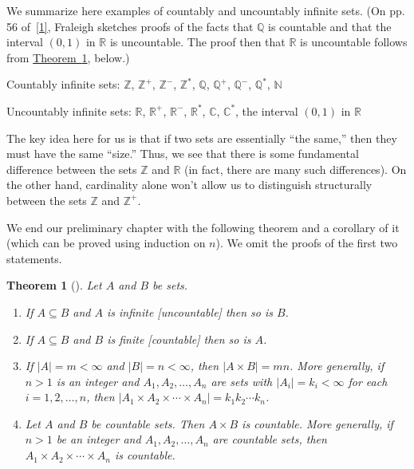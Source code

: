 \documentclass[10pt,]{book}
\theoremstyle{plain}
\newtheorem{theorem}{Theorem}[section]
\theoremstyle{definition}
\theoremstyle{definition}
\theoremstyle{definition}
\theoremstyle{definition}
\numberwithin{equation}{section}
\def\Z{\mathbb{Z}}
\def\R{\mathbb{R}}
\def\Q{\mathbb{Q}}
\def\C{\mathbb{C}}
\def\N{\mathbb{N}}
\newcommand{\lt}{<}
\begin{document}
We summarize here examples of countably and uncountably infinite sets. (On pp. 5\textendash{}6 of~\hyperlink{F}{[1]}, Fraleigh sketches proofs of the facts that \(\Q\) is countable and that the interval \((0,1)\) in \(\R\) is uncountable. The proof then that \(\R\) is uncountable follows from \hyperref[cardthm]{Theorem~\ref{cardthm}}, below.)%
\par
Countably infinite sets: \(\Z\), \(\Z^+\), \(\Z^-\), \(\Z^*\), \(\Q\), \(\Q^+\), \(\Q^-\), \(\Q^*\), \(\N\)%
\par
Uncountably infinite sets: \(\R\), \(\R^+\), \(\R^-\), \(\R^*\), \(\C\), \(\C^*\),  the interval \((0,1)\) in \(\R\)%
\par
The key idea here for us is that if two sets are essentially ``the same,'' then they must have the same ``size.'' Thus, we see that there is some fundamental difference between the sets \(\Z\) and \(\R\) (in fact, there are many such differences). On the other hand, cardinality alone won't allow us to distinguish structurally between the sets \(\Z\) and \(\Z^+\).%
\par
We end our preliminary chapter with the following theorem and a corollary of it (which can be proved using induction on \(n\)). We omit the proofs of the first two statements.%
\begin{theorem}[{}]\label{cardthm}
Let \(A\) and \(B\) be sets. \leavevmode%
\begin{enumerate}
\item\hypertarget{li-19}{}If \(A\subseteq B\) and \(A\) is infinite [uncountable] then so is \(B\).%
\item\hypertarget{li-20}{}If \(A\subseteq B\) and \(B\) is finite [countable] then so is \(A\).%
\item\hypertarget{li-21}{}If \(|A|=m\lt \infty\) and \(|B|=n\lt  \infty\), then \(|A\times B|=mn\).  More generally, if \(n>1\) is an integer and \(A_1, A_2, \ldots, A_n\)  are sets with \(|A_i|=k_i\lt \infty\) for each \(i=1,2,\ldots, n\), then \(|A_1 \times A_2 \times \cdots \times A_n|=k_1k_2\cdots k_n\).%
\item\hypertarget{li-22}{}Let \(A\) and \(B\) be countable sets. Then \(A \times B\) is countable. More generally,  if \(n>1\) be an integer and \(A_1,A_2,\ldots, A_n\) are countable  sets, then \(A_1\times A_2\times \cdots \times A_n\) is countable.%
\end{enumerate}
%
\end{theorem}
\end{document}
